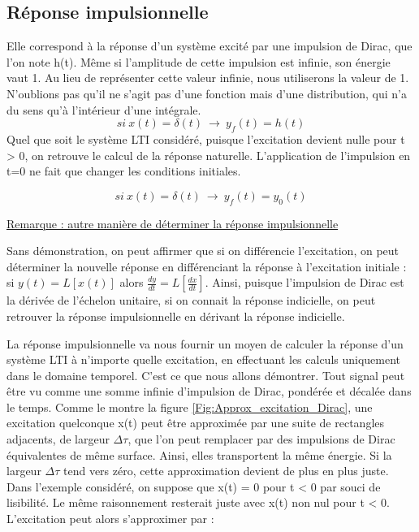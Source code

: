 \documentclass[]{report}
\begin{document}
	\subsection{Réponse impulsionnelle}
	Elle correspond à la réponse d'un système excité par une impulsion de Dirac, que l'on note h(t). Même si l'amplitude de cette impulsion est infinie, son énergie vaut 1. Au lieu de représenter cette valeur infinie, nous utiliserons la valeur de 1. N'oublions pas qu'il ne s'agit pas d'une fonction mais d'une distribution, qui n'a du sens qu'à l'intérieur d'une intégrale.
	\begin{equation}\label{key}
	si~x(t)=\delta (t)~\rightarrow ~y_{f}(t)=h(t)
	\end{equation}
	Quel que soit le système LTI considéré, puisque l'excitation devient nulle pour t > 0, on retrouve le calcul de la réponse naturelle. L'application de l'impulsion en t=0 ne fait que changer les conditions initiales.
	
	\begin{equation}\label{}
	si~x(t)=\delta (t)~\rightarrow ~y_{f}(t) = y_{0}(t)	 	
	\end{equation}
	
	\underline{Remarque : autre manière de déterminer la réponse impulsionnelle}
	
	Sans démonstration, on peut affirmer que si on différencie l'excitation, on peut déterminer la nouvelle réponse en différenciant la réponse à l'excitation initiale : si $y(t) = L[x(t)]$ alors $\frac{dy}{dt} = L[\frac{dx}{dt}] $.
	Ainsi, puisque l'impulsion de Dirac est la dérivée de l'échelon unitaire, si on connait la réponse indicielle, on peut retrouver la réponse impulsionnelle en dérivant la réponse indicielle.
	
	\vspace{1\baselineskip}
	La réponse impulsionnelle va nous fournir un moyen de calculer la
	réponse d'un système LTI à n'importe quelle excitation, en effectuant
	les calculs uniquement dans le domaine temporel. C'est ce que nous
	allons démontrer. Tout signal peut être vu comme une somme infinie
	d'impulsion de Dirac, pondérée et décalée dans le temps. Comme le montre
	la figure \ref{Fig:Approx_excitation_Dirac}, une excitation quelconque x(t) peut être
	approximée par une suite de rectangles adjacents, de largeur $ \Delta \tau $, que
	l'on peut remplacer par des impulsions de Dirac équivalentes de même
	surface. Ainsi, elles transportent la même énergie. Si la largeur $ \Delta \tau $
	tend vers zéro, cette approximation devient de plus en plus juste. Dans
	l'exemple considéré, on suppose que x(t) = 0 pour t \textless{} 0 par
	souci de lisibilité. Le même raisonnement resterait juste avec x(t) non
	nul pour t \textless{} 0. L'excitation peut alors s'approximer par :
	
\end{document}
